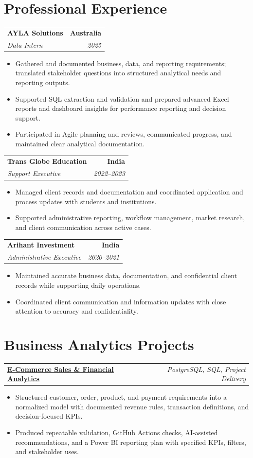 \documentclass[letterpaper,10pt]{article}
\makeatletter
\newcommand{\role}[4]{%
  \begin{tabularx}{\textwidth}{@{}Xr@{}}
    \textbf{#1} & \textbf{#2} \\
    \textit{#3} & \textit{#4}
  \end{tabularx}\vspace{-1pt}
}
\newcommand{\project}[2]{%
  \begin{tabularx}{\textwidth}{@{}Xr@{}}
    \textbf{#1} & \textit{#2}
  \end{tabularx}\vspace{-1pt}
}
\makeatother
\begin{document}
\section{Professional Experience}
\role{AYLA Solutions}{Australia}{Data Intern}{2025}
\begin{itemize}
  \item Gathered and documented business, data, and reporting requirements; translated stakeholder questions into structured analytical needs and reporting outputs.
  \item Supported SQL extraction and validation and prepared advanced Excel reports and dashboard insights for performance reporting and decision support.
  \item Participated in Agile planning and reviews, communicated progress, and maintained clear analytical documentation.
\end{itemize}
\vspace{1pt}

\role{Trans Globe Education}{India}{Support Executive}{2022--2023}
\begin{itemize}
  \item Managed client records and documentation and coordinated application and process updates with students and institutions.
  \item Supported administrative reporting, workflow management, market research, and client communication across active cases.
\end{itemize}
\vspace{1pt}

\role{Arihant Investment}{India}{Administrative Executive}{2020--2021}
\begin{itemize}
  \item Maintained accurate business data, documentation, and confidential client records while supporting daily operations.
  \item Coordinated client communication and information updates with close attention to accuracy and confidentiality.
\end{itemize}

\section{Business Analytics Projects}
\project{\href{https://github.com/jainalimehta/Ecommerce-Sales-Analytics}{E-Commerce Sales \& Financial Analytics}}{PostgreSQL, SQL, Project Delivery}
\begin{itemize}
  \item Structured customer, order, product, and payment requirements into a normalized model with documented revenue rules, transaction definitions, and decision-focused KPIs.
  \item Produced repeatable validation, GitHub Actions checks, AI-assisted recommendations, and a Power BI reporting plan with specified KPIs, filters, and stakeholder uses.
\end{itemize}
\vspace{1pt}
\end{document}
